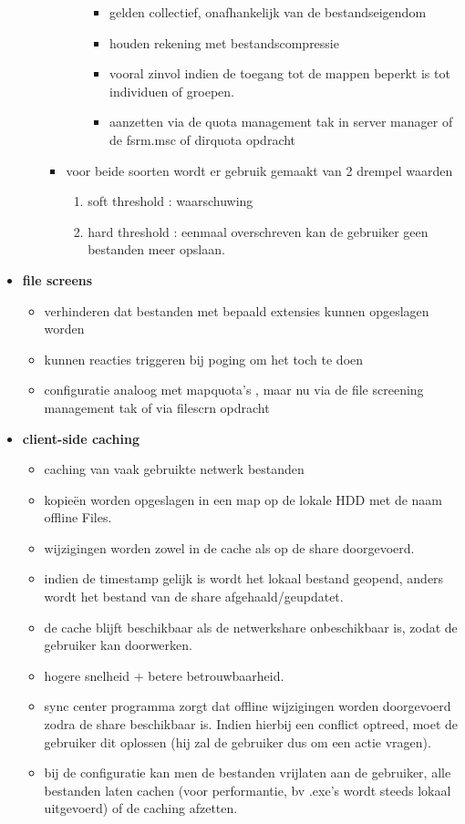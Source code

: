 \begin{itemize}
\begin{itemize}
\begin{itemize}
\begin{enumerate}
\begin{itemize}
\item gelden collectief, onafhankelijk van de bestandseigendom
\item houden rekening met bestandscompressie
\item vooral zinvol indien de toegang tot de mappen beperkt is tot individuen of groepen.
\item aanzetten via de quota management tak in server manager of de fsrm.msc of dirquota opdracht
\end{itemize}
\end{enumerate}
\item voor beide soorten wordt er gebruik gemaakt van 2 drempel waarden
\begin{enumerate}
\item soft threshold : waarschuwing
\item hard threshold : eenmaal overschreven kan de gebruiker geen bestanden meer opslaan.
\end{enumerate}
\end{itemize}
\end{itemize}

\item \textbf{file screens}
\begin{itemize}
\item verhinderen dat bestanden met bepaald extensies kunnen opgeslagen worden
\item kunnen reacties triggeren bij poging om het toch te doen
\item configuratie analoog met mapquota's , maar nu via de file screening management tak of via filescrn opdracht
\end{itemize}

\clearpage

\item \textbf{client-side caching}
\begin{itemize}
\item caching van vaak gebruikte netwerk bestanden
\item kopie\"en worden opgeslagen in een map op de lokale HDD met de naam offline Files.
\item wijzigingen worden zowel in de cache als op de share doorgevoerd.
\item indien de timestamp gelijk is wordt het lokaal bestand geopend, anders wordt het bestand van de share afgehaald/geupdatet.
\item de cache blijft beschikbaar als de netwerkshare onbeschikbaar is, zodat de gebruiker kan doorwerken.
\item hogere snelheid + betere betrouwbaarheid.
\item sync center programma zorgt dat offline wijzigingen worden doorgevoerd zodra de share beschikbaar is. Indien hierbij een conflict optreed, moet de gebruiker dit oplossen (hij zal de gebruiker dus om een actie vragen).
\item bij de configuratie kan men de bestanden vrijlaten aan de gebruiker, alle bestanden laten cachen (voor performantie, bv .exe's wordt steeds lokaal uitgevoerd) of de caching afzetten.
\end{itemize}


\end{itemize}
